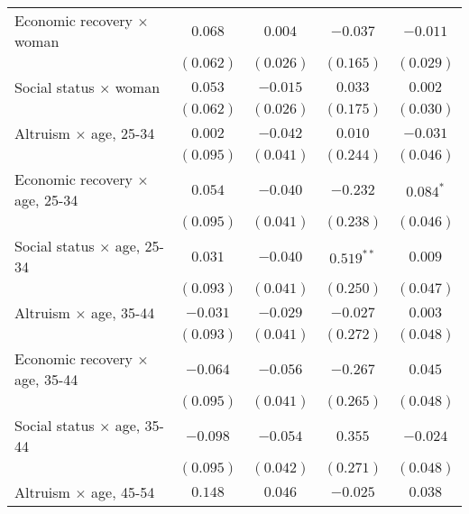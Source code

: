 \begin{table}
\begin{center}
\begin{tabular}{l c c c c}
Economic recovery $\times$ woman                    & $0.068$        & $0.004$       & $-0.037$      & $-0.011$      \\
                                                    & $(0.062)$      & $(0.026)$     & $(0.165)$     & $(0.029)$     \\
Social status $\times$ woman                        & $0.053$        & $-0.015$      & $0.033$       & $0.002$       \\
                                                    & $(0.062)$      & $(0.026)$     & $(0.175)$     & $(0.030)$     \\
Altruism $\times$ age, 25-34                        & $0.002$        & $-0.042$      & $0.010$       & $-0.031$      \\
                                                    & $(0.095)$      & $(0.041)$     & $(0.244)$     & $(0.046)$     \\
Economic recovery $\times$ age, 25-34               & $0.054$        & $-0.040$      & $-0.232$      & $0.084^{*}$   \\
                                                    & $(0.095)$      & $(0.041)$     & $(0.238)$     & $(0.046)$     \\
Social status $\times$ age, 25-34                   & $0.031$        & $-0.040$      & $0.519^{**}$  & $0.009$       \\
                                                    & $(0.093)$      & $(0.041)$     & $(0.250)$     & $(0.047)$     \\
Altruism $\times$ age, 35-44                        & $-0.031$       & $-0.029$      & $-0.027$      & $0.003$       \\
                                                    & $(0.093)$      & $(0.041)$     & $(0.272)$     & $(0.048)$     \\
Economic recovery $\times$ age, 35-44               & $-0.064$       & $-0.056$      & $-0.267$      & $0.045$       \\
                                                    & $(0.095)$      & $(0.041)$     & $(0.265)$     & $(0.048)$     \\
Social status $\times$ age, 35-44                   & $-0.098$       & $-0.054$      & $0.355$       & $-0.024$      \\
                                                    & $(0.095)$      & $(0.042)$     & $(0.271)$     & $(0.048)$     \\
Altruism $\times$ age, 45-54                        & $0.148$        & $0.046$       & $-0.025$      & $0.038$       \\

\end{tabular}
\end{center}
\end{table}
